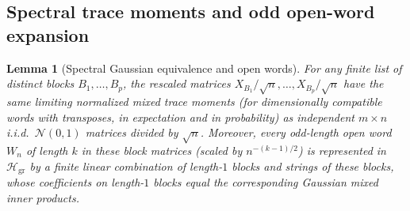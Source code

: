 \documentclass[11pt]{article}
\theoremstyle{plain}
\newtheorem{lemma}[theorem]{Lemma}
\theoremstyle{definition}
\theoremstyle{remark}
\begin{document}
\subsection{Spectral trace moments and odd open-word expansion}

\begin{lemma}[Spectral Gaussian equivalence and open words]\label{lem:spectral}
For any finite list of distinct blocks $B_1, \dots, B_p$, the rescaled matrices $X_{B_1}/\sqrt{n}, \dots, X_{B_p}/\sqrt{n}$ have the same limiting normalized mixed trace moments (for dimensionally compatible words with transposes, in expectation and in probability) as independent $m \times n$ i.i.d.\ $\mathcal{N}(0,1)$ matrices divided by $\sqrt{n}$.
Moreover, every odd-length open word $W_n$ of length $k$ in these block matrices (scaled by $n^{-(k-1)/2}$) is represented in $\mathcal{H}_{\mathrm{gr}}$ by a finite linear combination of length-$1$ blocks and strings of these blocks, whose coefficients on length-$1$ blocks equal the corresponding Gaussian mixed inner products.
\end{lemma}
\end{document}
